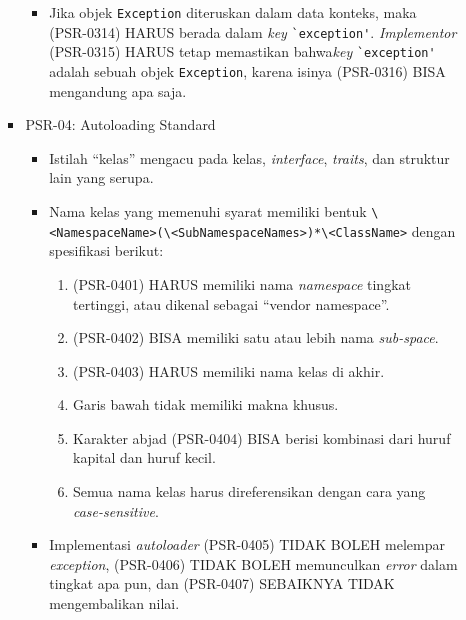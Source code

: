 \documentclass[a4paper,twoside]{article}
\begin{document}
\begin{enumerate}
\begin{enumerate}
\begin{itemize}
\begin{itemize}
					\item Jika objek \verb|Exception| diteruskan dalam data konteks, maka (PSR-0314) HARUS berada dalam \textit{key} \verb|`exception'|. \textit{Implementor} (PSR-0315) HARUS tetap memastikan bahwa\textit{key} \verb|`exception'| adalah sebuah objek \verb|Exception|, karena isinya (PSR-0316) BISA mengandung apa saja.
				\end{itemize}
				
				\item PSR-04: Autoloading Standard
				\begin{itemize}
					\item Istilah ``kelas'' mengacu pada kelas, \textit{interface}, \textit{traits}, dan struktur lain yang serupa.
					\item Nama kelas yang memenuhi syarat memiliki bentuk \verb|\<NamespaceName>(\<SubNamespaceNames>)*\<ClassName>| dengan spesifikasi berikut:
					\begin{enumerate}
						\item (PSR-0401) HARUS memiliki nama \textit{namespace} tingkat tertinggi, atau dikenal sebagai ``vendor namespace''.
						\item (PSR-0402) BISA memiliki satu atau lebih nama \textit{sub-space}.
						\item (PSR-0403) HARUS memiliki nama kelas di akhir.
						\item Garis bawah tidak memiliki makna khusus.
						\item Karakter abjad (PSR-0404) BISA berisi kombinasi dari huruf kapital dan huruf kecil.
						\item Semua nama kelas harus direferensikan dengan cara yang \textit{case-sensitive}.
					\end{enumerate}
					\item Implementasi \textit{autoloader} (PSR-0405) TIDAK BOLEH melempar \textit{exception}, (PSR-0406) TIDAK BOLEH memunculkan \textit{error} dalam tingkat apa pun, dan (PSR-0407) SEBAIKNYA TIDAK mengembalikan nilai. 
				\end{itemize}
				

\end{itemize}
\end{enumerate}
\end{enumerate}
\end{document}

